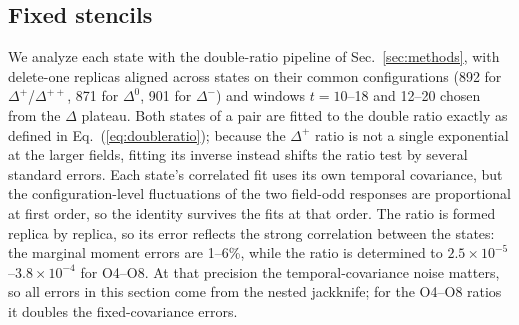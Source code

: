\documentclass[aps,prd,reprint,twocolumn,superscriptaddress,nofootinbib,longbibliography]{revtex4-2}
\begin{document}
\subsection{Fixed stencils}

We analyze each state with the double-ratio pipeline of Sec.~\ref{sec:methods}, with delete-one replicas aligned across states on their common configurations (892 for $\Delta^+$/$\Delta^{++}$, 871 for $\Delta^0$, 901 for $\Delta^-$) and windows $t=10$--18 and 12--20 chosen from the $\Delta$ plateau. Both states of a pair are fitted to the double ratio exactly as defined in Eq.~(\ref{eq:doubleratio}); because the $\Delta^+$ ratio is not a single exponential at the larger fields, fitting its inverse instead shifts the ratio test by several standard errors. Each state's correlated fit uses its own temporal covariance, but the configuration-level fluctuations of the two field-odd responses are proportional at first order, so the identity survives the fits at that order. The ratio is formed replica by replica, so its error reflects the strong correlation between the states: the marginal moment errors are 1--6\%, while the ratio is determined to $2.5\times10^{-5}$--$3.8\times10^{-4}$ for O4--O8. At that precision the temporal-covariance noise matters, so all errors in this section come from the nested jackknife; for the O4--O8 ratios it doubles the fixed-covariance errors.
\end{document}
